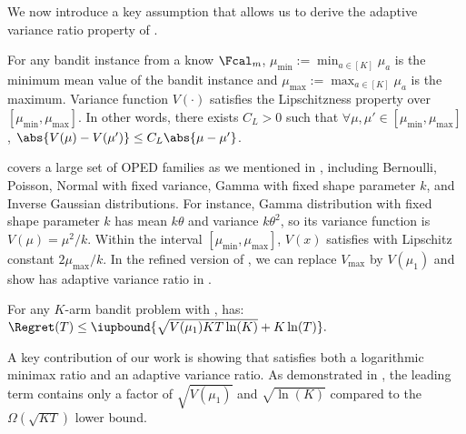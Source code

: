We now introduce a key assumption that allows us to derive the adaptive variance ratio property of \expklms.
\begin{assum} \label{assum:lip}
    For any bandit instance from a know $\Fcal_m$, $\mu_{\min} := \min_{a \in [K]} \mu_a$ is the minimum mean value of the bandit instance and $\mu_{\max}:= \max_{a \in [K]} \mu_a$ is the maximum. Variance function $V(\cdot)$ satisfies the Lipschitzness property over $[\mu_{\min}, \mu_{\max}]$. In other words, there exists $C_L > 0$ such that $\forall \mu, \mu' \in [\mu_{\min}, \mu_{\max}]$, $\abs{V(\mu) - V(\mu')} \leq C_L\abs{ \mu - \mu' }$.
\end{assum}


 covers a large set of OPED families as we mentioned in , including Bernoulli, Poisson, Normal with fixed variance, Gamma with fixed shape parameter $k$, and Inverse Gaussian distributions. 
For instance, Gamma distribution with fixed shape parameter $k$ has mean $k\theta$ and variance $k\theta^2$, so its variance function is $V(\mu) = \mu^2/k$. Within the interval $[\mu_{\min}, \mu_{\max}]$, $V(x)$ satisfies  with Lipschitz constant $2\mu_{\max}/k$.
In the refined version of , we can replace $V_{\max}$ by $V(\mu_1)$ and show \expklms has adaptive variance ratio in .

\begin{corollary}\label{corol:exp-kl-ms-adaptive-variance}
    For any $K$-arm bandit problem with ,
    \expklms has:
    $
        \Regret(T) \leq \iupbound{\sqrt{V(\mu_1) KT\ln(K)} + K \ln(T)}.
    $
\end{corollary}





A key contribution of our work is showing that \expklms satisfies both a logarithmic minimax ratio and an adaptive variance ratio. 
As demonstrated in , the leading term contains only a factor of $\sqrt{V(\mu_1)}$ and $\sqrt{\ln(K)}$ compared to the $\Omega(\sqrt{KT})$ lower bound.
